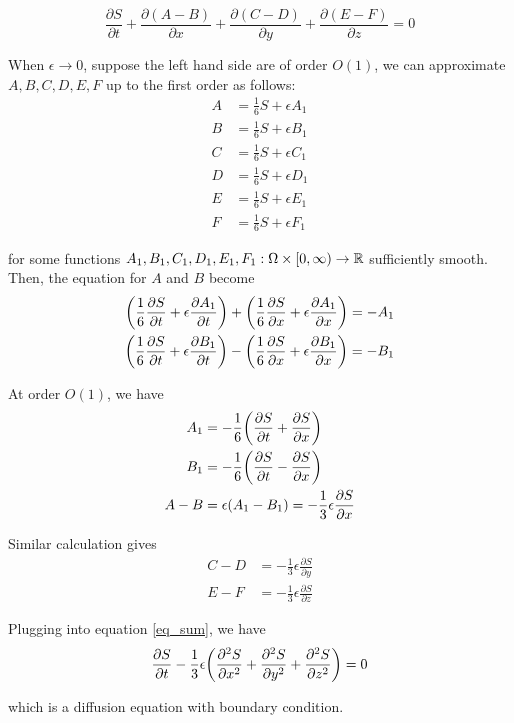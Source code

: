 \begin{equation}
	\label{eq_sum}
	\frac{\partial S}{\partial t} + \frac{\partial (A - B)}{\partial x} + \frac{\partial (C - D)}{\partial y} + \frac{\partial (E - F)}{\partial z} = 0
\end{equation}

When $\epsilon \to 0$, suppose the left hand side are of order $O(1)$, we can approximate $A, B, C, D, E, F$ up to the first order as follows:
\begin{align*}
	A &= \frac{1}{6} S + \epsilon A_1 \\
	B &= \frac{1}{6} S + \epsilon B_1 \\
	C &= \frac{1}{6} S + \epsilon C_1 \\
	D &= \frac{1}{6} S + \epsilon D_1 \\
	E &= \frac{1}{6} S + \epsilon E_1 \\
	F &= \frac{1}{6} S + \epsilon F_1
\end{align*}

for some functions $A_1, B_1, C_1, D_1, E_1, F_1: \Omega \times [0, \infty) \to \R$ sufficiently smooth. Then, the equation for $A$ and $B$ become
\begin{align*}
	\tuple*{\frac{1}{6} \frac{\partial S}{\partial t} + \epsilon \frac{\partial A_1}{\partial t}} + \tuple*{\frac{1}{6} \frac{\partial S}{\partial x} + \epsilon \frac{\partial A_1}{\partial x}} = - A_1 \\
	\tuple*{\frac{1}{6} \frac{\partial S}{\partial t} + \epsilon \frac{\partial B_1}{\partial t}} - \tuple*{\frac{1}{6} \frac{\partial S}{\partial x} + \epsilon \frac{\partial B_1}{\partial x}} = - B_1
\end{align*}

At order $O(1)$, we have
\begin{align*}
	A_1 &= - \frac{1}{6}\tuple*{\frac{\partial S}{\partial t} + \frac{\partial S}{\partial x}} \\
	B_1 &= - \frac{1}{6}\tuple*{\frac{\partial S}{\partial t} - \frac{\partial S}{\partial x}} \\
	A - B &= \epsilon(A_1 - B_1) = - \frac{1}{3} \epsilon \frac{\partial S}{\partial x}
\end{align*}

Similar calculation gives
\begin{align*}
	C - D &= - \frac{1}{3} \epsilon \frac{\partial S}{\partial y} \\
	E - F &= - \frac{1}{3} \epsilon \frac{\partial S}{\partial z} 
\end{align*}

Plugging into equation \ref{eq_sum}, we have
$$
	\frac{\partial S}{\partial t} - \frac{1}{3} \epsilon \tuple*{\frac{\partial^2 S}{\partial x^2} + \frac{\partial^2 S}{\partial y^2} + \frac{\partial^2 S}{\partial z^2}} = 0 
$$

which is a diffusion equation with boundary condition.



